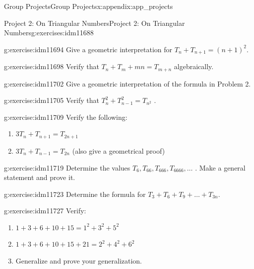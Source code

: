 \documentclass[oneside,10pt,]{book}
\numberwithin{equation}{chapter}
\begin{document}
\begin{appendixptx}{Group Projects}{}{Group Projects}{}{}{x:appendix:app_projects}
\begin{exercises-section-numberless}{Project 2: On Triangular Numbers}{}{Project 2: On Triangular Numbers}{}{}{g:exercises:idm11688}
\begin{divisionexercise}{1}{}{}{g:exercise:idm11694}
Give a geometric interpretation for \(T_{n} + T_{n + 1} = \left( n + 1 \right)^{2}.\)%
\end{divisionexercise}%
\begin{divisionexercise}{2}{}{}{g:exercise:idm11698}%
Verify that \(T_{n} + T_{m} + mn = T_{m + n}\) algebraically.%
\end{divisionexercise}%
\begin{divisionexercise}{3}{}{}{g:exercise:idm11702}%
Give a geometric interpretation of the formula in Problem 2.%
\end{divisionexercise}%
\begin{divisionexercise}{4}{}{}{g:exercise:idm11705}%
Verify that \(T_{n}^{2} + T_{n - 1}^{2} = T_{n^{2}}\) .%
\end{divisionexercise}%
\begin{divisionexercise}{5}{}{}{g:exercise:idm11709}%
Verify the following:%
\begin{enumerate}[label=(\alph*)]
\item{}\(3T_{n} + T_{n + 1} = T_{2n + 1}\)%
\item{}\(3T_{n} + T_{n - 1} = T_{2n}\) (also give a geometrical proof)%
\end{enumerate}
%
\end{divisionexercise}%
\begin{divisionexercise}{6}{}{}{g:exercise:idm11719}%
Determine the values \(T_{6},T_{66},T_{666},T_{6666},\ldots\) . Make a general statement and prove it.%
\end{divisionexercise}%
\begin{divisionexercise}{7}{}{}{g:exercise:idm11723}%
Determine the formula for \(T_{3} + T_{6} + T_{9} + \ldots + T_{3n}.\)%
\end{divisionexercise}%
\begin{divisionexercise}{8}{}{}{g:exercise:idm11727}%
Verify:%
\begin{enumerate}[label=(\alph*)]
\item{}\(1 + 3 + 6 + 10 + 15 = 1^{2} + 3^{2} + 5^{2}\)%
\item{}\(1 + 3 + 6 + 10 + 15 + 21 = 2^{2} + 4^{2} + 6^{2}\)%
\item{}Generalize and prove your generalization.%
\end{enumerate}
%
\end{divisionexercise}%
\end{exercises-section-numberless}
%
%
\typeout{************************************************}
\typeout{************************************************}

\end{appendixptx}
\end{document}
